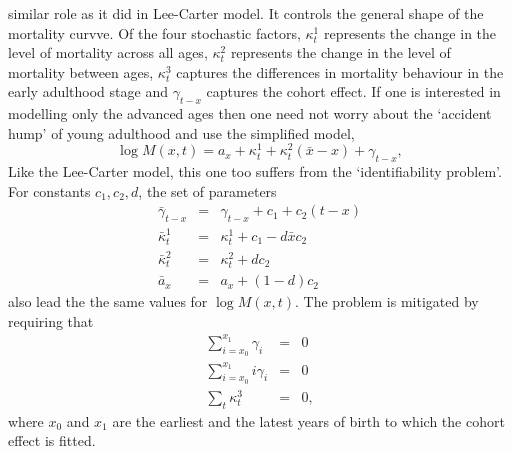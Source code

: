\documentclass{article}
\numberwithin{equation}{section}
\begin{document}
similar role as it did in Lee-Carter model. It controls the general shape
of the mortality curvve. Of the four stochastic factors, $\kappa_t^1$
represents the change in the level of mortality across all ages, $\kappa_t^2$
represents the change in the level of mortality between ages, $\kappa_t^3$
captures the differences in mortality behaviour in the early adulthood stage
and $\gamma_{t-x}$ captures the cohort effect. If one is interested in 
modelling only the advanced ages then one need not worry about the `accident
hump' of young adulthood and use the simplified model,
\begin{equation}\label{s9e4}
\log M(x,t) = a_x + \kappa^1_t + \kappa^2_t(\bar{x} - x) + \gamma_{t-x},
\end{equation}
Like the Lee-Carter model, this one too suffers from the `identifiability
problem'. For constants $c_1, c_2, d$, the set of parameters
\begin{eqnarray*}
\bar{\gamma}_{t-x} &=& \gamma_{t-x} + c_1 + c_2(t - x) \\
\bar{\kappa}_t^1 &=& \kappa^1_t + c_1 - d\bar{x}c_2 \\
\bar{\kappa}_t^2 &=& \kappa^2_t + dc_2 \\
\bar{a}_x &=& a_x + (1 - d)c_2
\end{eqnarray*}
also lead the the same values for $\log M(x, t)$. The problem is mitigated 
by requiring that 
\begin{eqnarray*}
\sum_{i=x_0}^{x_1} \gamma_i &=& 0 \\
\sum_{i=x_0}^{x_1} i\gamma_i &=& 0 \\
\sum_t\kappa_t^3 &=& 0,
\end{eqnarray*}
where $x_0$ and $x_1$ are the earliest and the latest years of birth to which
the cohort effect is fitted. 


\end{document}
